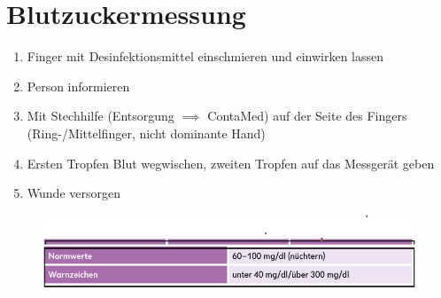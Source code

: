 \chapter{Blutzuckermessung}
\begin{enumerate}
    \item Finger mit Desinfektionsmittel einschmieren und einwirken lassen
    \item Person informieren
    \item Mit Stechhilfe (Entsorgung $\implies$ ContaMed) auf der Seite des Fingers (Ring-/Mittelfinger, nicht dominante Hand)
    \item Ersten Tropfen Blut wegwischen, zweiten Tropfen auf das Messgerät geben
    \item Wunde versorgen
\end{enumerate}
\begin{figure}[H]
    \centering
    \includegraphics[width=\textwidth]{res/blutzucker.png}
\end{figure}